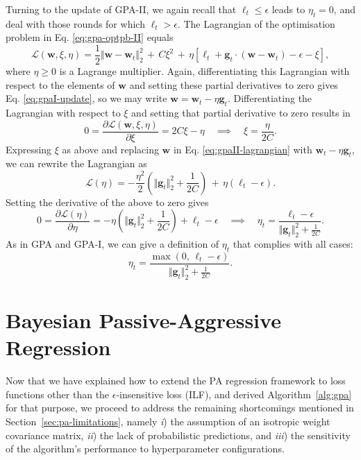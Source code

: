 Turning to the update of GPA-II, we again recall that $\ell_t \leq \epsilon$ leads to $\eta_t = 0$, and deal with those rounds for which $\ell_t > \epsilon$. The Lagrangian of the optimisation problem in Eq. \eqref{eq:gpa-optpb-II} equals
\begin{equation}
\label{eq:gpaII-lagrangian}
	\mathcal{L}(\mathbf{w}, \xi, \eta)
	= \frac{1}{2}\Vert\mathbf{w} - \mathbf{w}_t\Vert_2^2 \, + \, C\xi^2 \, + \, \eta[\ell_t + \mathbf{g}_t\cdot(\mathbf{w} - \mathbf{w}_t) - \epsilon - \xi],	
\end{equation}
where $\eta \geq 0$ is a Lagrange multiplier. Again, differentiating this Lagrangian with respect to the elements of $\mathbf{w}$ and setting these partial derivatives to zero gives Eq. \eqref{eq:gpaI-update}, so we may write $\mathbf{w} = \mathbf{w}_t - \eta\mathbf{g}_t$. Differentiating the Lagrangian with respect to $\xi$ and setting that partial derivative to zero results in
\begin{equation}
	0 = \frac{\partial\mathcal{L}(\mathbf{w}, \xi, \eta)}{\partial\xi} = 2C\xi - \eta
	\quad \implies \quad \xi = \frac{\eta}{2C}.
\end{equation}
Expressing $\xi$ as above and replacing $\mathbf{w}$ in Eq. \eqref{eq:gpaII-lagrangian} with $\mathbf{w}_t - \eta\mathbf{g}_t$, we can rewrite the Lagrangian as
\begin{equation}
	\mathcal{L}(\eta)
	= -\frac{\eta^2}{2}\left(\Vert\mathbf{g}_t\Vert_2^2 + \frac{1}{2C}\right) \, + \, \eta(\ell_t - \epsilon).
\end{equation}
Setting the derivative of the above to zero gives
\begin{equation}
	0 = \frac{\partial\mathcal{L}(\eta)}{\partial\eta} = -\eta\left(\Vert\mathbf{g}_t\Vert_2^2 + \frac{1}{2C}\right) + \ell_t - \epsilon
	\quad \implies \quad
	\eta_t = \frac{\ell_t - \epsilon}{\Vert\mathbf{g}_t\Vert_2^2 + \frac{1}{2C}}.
\end{equation}
As in GPA and GPA-I, we can give a definition of $\eta_t$ that complies with all cases:
\begin{equation}
	\eta_t = \frac{\max(0,\,\ell_t - \epsilon)}{\Vert\mathbf{g}_t\Vert_2^2 + \frac{1}{2C}}.
\end{equation}


\section{Bayesian Passive-Aggressive Regression}
\label{sec:Bayes-PA}

Now that we have explained how to extend the PA regression framework to loss functions other than the $\epsilon$-insensitive loss (ILF), and derived Algorithm~\ref{alg:gpa} for that purpose, we proceed to address the remaining shortcomings mentioned in Section~\ref{sec:pa-limitations}, namely \emph{i}) the assumption of an isotropic weight covariance matrix, \emph{ii}) the lack of probabilistic predictions, and \emph{iii}) the sensitivity of the algorithm's performance to hyperparameter configurations.

